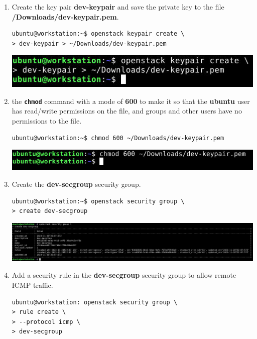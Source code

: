 \documentclass[letterpaper, 12pt]{article}
\begin{document}
\begin{enumerate}
    \item Create the key pair \textbf{dev-keypair} and save the private key to the file
\textbf{\texttildemid/Downloads/dev-keypair.pem}.
\begin{lstlisting}
ubuntu@workstation:~$ openstack keypair create \
> dev-keypair > ~/Downloads/dev-keypair.pem
\end{lstlisting}

    \begin{center}
        \includegraphics[width=\linewidth]{images/part1/step13.png}
    \end{center}

    \item the \textbf{\texttt{chmod}} command with a mode of \textbf{600} to make it so that the \textbf{ubuntu} user
has read/write permissions on the file, and groups and other users have no permissions to the file.
\begin{lstlisting}
ubuntu@workstation:~$ chmod 600 ~/Downloads/dev-keypair.pem
\end{lstlisting}

    \begin{center}
        \includegraphics[width=\linewidth]{images/part1/step14.png}
    \end{center}

    \item Create the \textbf{dev-secgroup} security group.
\begin{lstlisting}
ubuntu@workstation:~$ openstack security group \
> create dev-secgroup
\end{lstlisting}

    \begin{center}
        \includegraphics[width=\linewidth]{images/part1/step15.png}
    \end{center}

    \item Add a security rule in the \textbf{dev-secgroup} security group to allow remote ICMP traffic.
\begin{lstlisting}
ubuntu@workstation: openstack security group \
> rule create \
> --protocol icmp \
> dev-secgroup
\end{lstlisting}


\end{enumerate}
\end{document}
